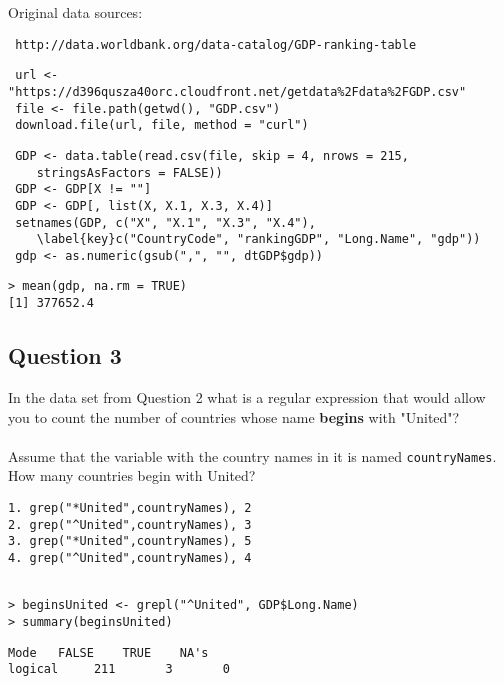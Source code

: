 \documentclass[]{article}
\begin{document}
Original data sources:
\begin{verbatim} http://data.worldbank.org/data-catalog/GDP-ranking-table
\end{verbatim}
\begin{framed}
\begin{verbatim}
 url <- "https://d396qusza40orc.cloudfront.net/getdata%2Fdata%2FGDP.csv"
 file <- file.path(getwd(), "GDP.csv")
 download.file(url, file, method = "curl")
 \end{verbatim}
 \end{framed}
 \begin{framed}
 \begin{verbatim}
 GDP <- data.table(read.csv(file, skip = 4, nrows = 215,
    stringsAsFactors = FALSE))
 GDP <- GDP[X != ""]
 GDP <- GDP[, list(X, X.1, X.3, X.4)]
 setnames(GDP, c("X", "X.1", "X.3", "X.4"), 
    \label{key}c("CountryCode", "rankingGDP", "Long.Name", "gdp"))
 gdp <- as.numeric(gsub(",", "", dtGDP$gdp))

\end{verbatim}
\end{framed}

\begin{verbatim}
> mean(gdp, na.rm = TRUE)
[1] 377652.4
\end{verbatim}
\newpage
\subsection*{Question 3}
In the data set from Question 2 what is a regular expression that would allow you to count the number of countries whose name \textbf{begins} with "United"? \\ \\ Assume that the variable with the country names in it is named \texttt{countryNames}.\\ How many countries begin with United?
\begin{verbatim}
1. grep("*United",countryNames), 2
2. grep("^United",countryNames), 3
3. grep("*United",countryNames), 5
4. grep("^United",countryNames), 4
\end{verbatim}


\begin{framed}
\begin{verbatim}

> beginsUnited <- grepl("^United", GDP$Long.Name)
> summary(beginsUnited)
\end{verbatim}
\end{framed}
\begin{verbatim}
Mode   FALSE    TRUE    NA's 
logical     211       3       0 
\end{verbatim}
\newpage
\end{document}
